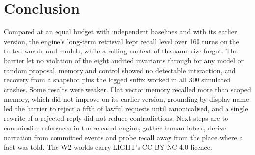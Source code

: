 \documentclass[letterpaper,journal]{IEEEtran}
\begin{document}
\section{Conclusion}\label{sec:conclusion}

Compared at an equal budget with independent baselines and with its earlier version, the engine's long-term retrieval kept recall level over 160 turns on the tested worlds and models, while a rolling context of the same size forgot. The barrier let no violation of the eight audited invariants through for any model or random proposal, memory and control showed no detectable interaction, and recovery from a snapshot plus the logged suffix worked in all 300 simulated crashes. Some results were weaker. Flat vector memory recalled more than scoped memory, which did not improve on its earlier version, grounding by display name led the barrier to reject a fifth of lawful requests until canonicalised, and a single rewrite of a rejected reply did not reduce contradictions. Next steps are to canonicalise references in the released engine, gather human labels, derive narration from committed events and probe recall away from the place where a fact was told. The W2 worlds carry LIGHT's CC BY-NC 4.0 licence.

\ifdefined\NoReferences
  \makeatletter
  \renewenvironment{thebibliography}[1]{\setbox0=\vbox\bgroup\list{}{\usecounter{enumiv}}}{\endlist\egroup}
  \makeatother
\fi


\end{document}

